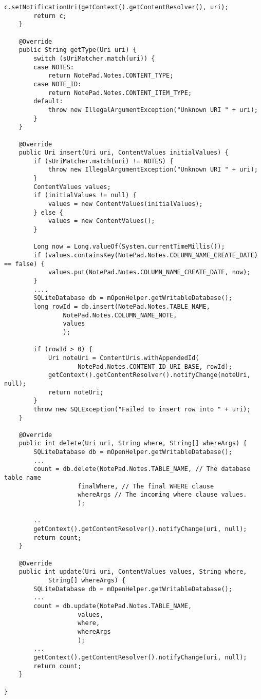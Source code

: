 \begin{lstlisting}[frame=single, caption=ContentProvider 예, label=src:provider]
		c.setNotificationUri(getContext().getContentResolver(), uri);
		return c;
	}

	@Override
	public String getType(Uri uri) {
		switch (sUriMatcher.match(uri)) {
		case NOTES:
			return NotePad.Notes.CONTENT_TYPE;
		case NOTE_ID:
			return NotePad.Notes.CONTENT_ITEM_TYPE;
		default:
			throw new IllegalArgumentException("Unknown URI " + uri);
		}
	}

	@Override
	public Uri insert(Uri uri, ContentValues initialValues) {
		if (sUriMatcher.match(uri) != NOTES) {
			throw new IllegalArgumentException("Unknown URI " + uri);
		}
		ContentValues values;
		if (initialValues != null) {
			values = new ContentValues(initialValues);
		} else {
			values = new ContentValues();
		}

		Long now = Long.valueOf(System.currentTimeMillis());
		if (values.containsKey(NotePad.Notes.COLUMN_NAME_CREATE_DATE) == false) {
			values.put(NotePad.Notes.COLUMN_NAME_CREATE_DATE, now);
		}
		....
		SQLiteDatabase db = mOpenHelper.getWritableDatabase();
		long rowId = db.insert(NotePad.Notes.TABLE_NAME,
				NotePad.Notes.COLUMN_NAME_NOTE, 
				values 
				);

		if (rowId > 0) {
			Uri noteUri = ContentUris.withAppendedId(
					NotePad.Notes.CONTENT_ID_URI_BASE, rowId);
			getContext().getContentResolver().notifyChange(noteUri, null);
			return noteUri;
		}
		throw new SQLException("Failed to insert row into " + uri);
	}

	@Override
	public int delete(Uri uri, String where, String[] whereArgs) {
		SQLiteDatabase db = mOpenHelper.getWritableDatabase();
		...
		count = db.delete(NotePad.Notes.TABLE_NAME, // The database table name
					finalWhere, // The final WHERE clause
					whereArgs // The incoming where clause values.
					);

		..
		getContext().getContentResolver().notifyChange(uri, null);
		return count;
	}

	@Override
	public int update(Uri uri, ContentValues values, String where,
			String[] whereArgs) {
		SQLiteDatabase db = mOpenHelper.getWritableDatabase();
		...
		count = db.update(NotePad.Notes.TABLE_NAME, 
					values, 
					where, 
					whereArgs 
					);
		...
		getContext().getContentResolver().notifyChange(uri, null);
		return count;
	}

}
\end{lstlisting}
